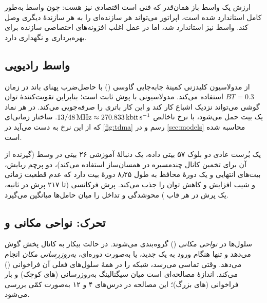 \documentclass[11pt,a4paper]{article}
\begin{document}
ارزش یک واسط باز همان‌قدر که فنی است اقتصادی نیز هست: چون واسط  به‌طور کامل
استاندارد شده است، اپراتور می‌تواند  هر سازنده‌ای را به  هر سازندهٔ
دیگری وصل کند. واسط  نیز استاندارد شد، اما در عمل اغلب افزونه‌های اختصاصی
سازنده برای بهره‌برداری و نگهداری دارد.

\subsection{واسط رادیویی }
 از مدولاسیون کلیدزنی کمینهٔ جابه‌جایی گاوسی () با حاصل‌ضرب پهنای
باند در زمان $BT = 0.3$ استفاده می‌کند.  مدولاسیونی با پوش ثابت است؛ بنابراین
تقویت‌کنندهٔ توان گوشی می‌تواند نزدیک اشباع کار کند و این کار باتری را صرفه‌جویی می‌کند.
در هر نماد یک بیت حمل می‌شود، با نرخ ناخالص
$13/48\,\mathrm{MHz} \approx \qty{270.833}{\kilo\bit\per\second}$. ساختار زمانی‌ای که از این
نرخ به دست می‌آید در \cref{fig:tdma} رسم و در \cref{sec:models} محاسبه شده است.

یک بُرست عادی دو بلوک ۵۷ بیتی داده، یک دنبالهٔ آموزشی ۲۶ بیتی در وسط (گیرنده از آن برای
تخمین کانال چندمسیره در همسان‌ساز استفاده می‌کند)، دو پرچم ربایش، بیت‌های انتهایی و یک
دورهٔ محافظ به طول ۸٫۲۵ دورهٔ بیت دارد که عدم قطعیت زمانی و شیب افزایش و کاهش توان را جذب
می‌کند. پرش فرکانسی (تا ۲۱۷ پرش در ثانیه، یک پرش در هر قاب ) محوشدگی و تداخل
را میان حامل‌ها میانگین می‌گیرد.

\subsection{تحرک: نواحی مکانی و }
سلول‌ها در \emph{نواحی مکانی} () گروه‌بندی می‌شوند.  در حالت بیکار به
کانال پخش گوش می‌دهد و تنها هنگام ورود به یک  جدید، یا به‌صورت دوره‌ای،
\emph{به‌روزرسانی مکان} انجام می‌دهد. وقتی تماسی می‌رسد، شبکه  را در همهٔ
سلول‌های  فعلی آن فراخوانی () می‌کند. اندازهٔ  مصالحه‌ای است
میان سیگنالینگ به‌روزرسانی (های کوچک) و بار فراخوانی (های بزرگ)؛ این
مصالحه در درس‌های ۴ و ۱۲ به‌صورت کمّی بررسی می‌شود.
\end{document}
